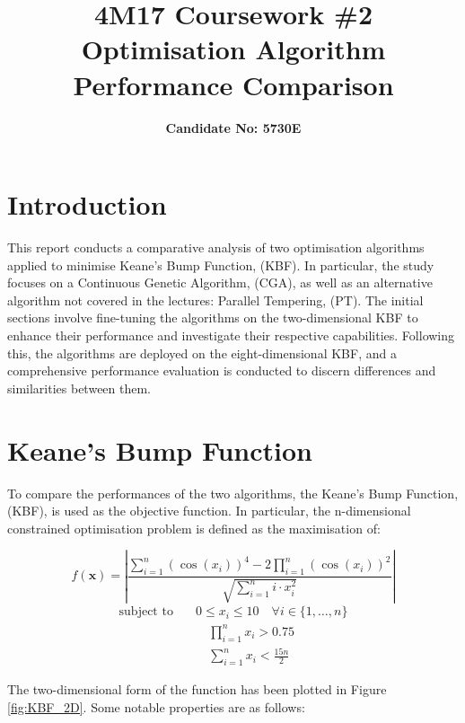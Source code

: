 \documentclass[10pt]{article}
\title{\textbf{4M17 Coursework \#2 \\ Optimisation Algorithm Performance Comparison}}
\author{\textbf{Candidate No: 5730E}}
\begin{document}

\vspace{-3cm}
\maketitle
\begin{multicols}{2}
\section{Introduction}
This report conducts a comparative analysis of two optimisation algorithms applied to minimise Keane's Bump Function, (KBF). In particular, the study focuses on a Continuous Genetic Algorithm, (CGA), as well as an alternative algorithm not covered in the lectures: Parallel Tempering, (PT). The initial sections involve fine-tuning the algorithms on the two-dimensional KBF to enhance their performance and investigate their respective capabilities. Following this, the algorithms are deployed on the eight-dimensional KBF, and a comprehensive performance evaluation is conducted to discern differences and similarities between them. 

\section{Keane's Bump Function}

To compare the performances of the two algorithms, the Keane's Bump Function, (KBF), is used as the objective function. In particular, the n-dimensional constrained optimisation problem is defined as the maximisation of:

\begin{equation}
    f(\mathbf{x}) = \left| \frac{\sum_{i=1}^{n} (\cos(x_i))^4 - 2\prod_{i=1}^{n} (\cos(x_i))^2}{\sqrt{\sum_{i=1}^{n} i \cdot x_i^2}} \right|
    \label{eq:KBF_cost}
\end{equation}
\begin{equation}
    \begin{aligned}
        \text{subject to} \quad & 0 \leq x_i \leq 10 \quad \forall i \in \{1, \dots, n\} \\
        & \quad \prod_{i=1}^{n} x_i > 0.75 \\
        & \quad \sum_{i=1}^{n} x_i < \frac{15n}{2}
    \end{aligned} 
    \label{eq:KBF_constraints}
\end{equation}

The two-dimensional form of the function has been plotted in Figure \ref{fig:KBF_2D}. Some notable properties are as follows:


\end{multicols}
\end{document}
